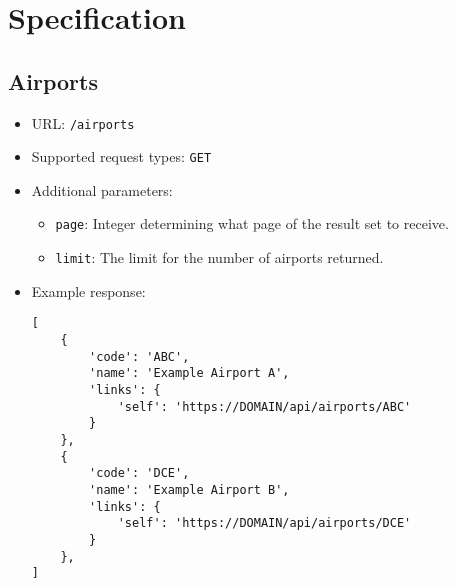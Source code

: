 \documentclass[a4paper, 12pt]{article}
\begin{document}
\section{Specification}

	\subsection{Airports}
		\begin{itemize}
			\item URL: \texttt{/airports}
			\item Supported request types: \texttt{GET}
			\item Additional parameters:
				\begin{itemize}
					\item \texttt{page}: Integer determining what page of the result set to receive.
					\item \texttt{limit}: The limit for the number of airports returned.
				\end{itemize}
			\item Example response:
			\begin{lstlisting}
[
	{
		'code': 'ABC',
		'name': 'Example Airport A',
		'links': {
			'self': 'https://DOMAIN/api/airports/ABC'
		}
	},
	{
		'code': 'DCE',
		'name': 'Example Airport B',
		'links': {
			'self': 'https://DOMAIN/api/airports/DCE'
		}
	},
]
			\end{lstlisting}
		\end{itemize}
\end{document}
